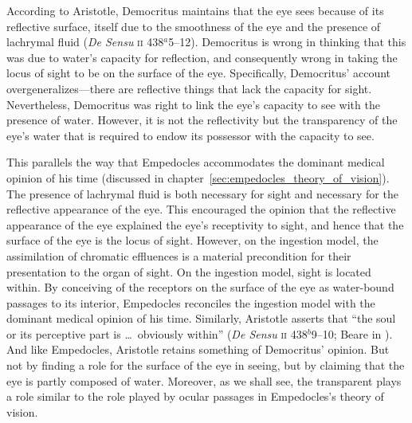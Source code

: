 According to Aristotle, Democritus maintains that the eye sees because of its reflective surface, itself due to the smoothness of the eye and the presence of lachrymal fluid (\emph{De Sensu} \textsc{ii} 438\( ^{a} \)5--12). Democritus is wrong in thinking that this was due to water's capacity for reflection, and consequently wrong in taking the locus of sight to be on the surface of the eye. Specifically, Democritus' account overgeneralizes---there are reflective things that lack the capacity for sight. Nevertheless, Democritus was right to link the eye's capacity to see with the presence of water. However, it is not the reflectivity but the transparency of the eye's water that is required to endow its possessor with the capacity to see. 

This parallels the way that Empedocles accommodates the dominant medical opinion of his time (discussed in chapter~\ref{sec:empedocles_theory_of_vision}). The presence of lachrymal fluid is both necessary for sight and necessary for the reflective appearance of the eye. This encouraged the opinion that the reflective appearance of the eye explained the eye's receptivity to sight, and hence that the surface of the eye is the locus of sight. However, on the ingestion model, the assimilation of chromatic effluences is a material precondition for their presentation to the organ of sight. On the ingestion model, sight is located within. By conceiving of the receptors on the surface of the eye as water-bound passages to its interior, Empedocles reconciles the ingestion model with the dominant medical opinion of his time. Similarly, Aristotle asserts that ``the soul or its perceptive part is \ldots\ obviously within'' (\emph{De Sensu} \textsc{ii} 438\( ^{b} \)9--10; Beare in \citealt[6]{Barnes:1984uq}). And like Empedocles, Aristotle retains something of Democritus' opinion. But not by finding a role for the surface of the eye in seeing, but by claiming that the eye is partly composed of water. Moreover, as we shall see, the transparent plays a role similar to the role played by ocular passages in Empedocles's theory of vision.

